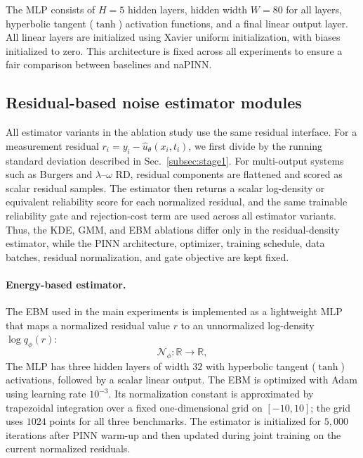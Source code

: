 \documentclass{article}
\theoremstyle{plain}
\theoremstyle{definition}
\theoremstyle{remark}
\begin{document}
The MLP consists of $H=5$ hidden layers, hidden width $W=80$ for all layers, hyperbolic tangent ($\tanh$) activation functions, and a final linear output layer. All linear layers are initialized using Xavier uniform initialization, with biases initialized to zero. This architecture is fixed across all experiments to ensure a fair comparison between baselines and naPINN.

\subsection{Residual-based noise estimator modules}
All estimator variants in the ablation study use the same residual interface.
For a measurement residual $r_i=y_i-\hat{u}_\theta(x_i,t_i)$, we first divide by the running standard deviation described in Sec.~\ref{subsec:stage1}.
For multi-output systems such as Burgers and $\lambda$--$\omega$ RD, residual components are flattened and scored as scalar residual samples.
The estimator then returns a scalar log-density or equivalent reliability score for each normalized residual, and the same trainable reliability gate and rejection-cost term are used across all estimator variants.
Thus, the KDE, GMM, and EBM ablations differ only in the residual-density estimator, while the PINN architecture, optimizer, training schedule, data batches, residual normalization, and gate objective are kept fixed.

\paragraph{Energy-based estimator.}
The EBM used in the main experiments is implemented as a lightweight MLP that maps a normalized residual value $r$ to an unnormalized log-density $\log q_\phi (r)$:
\begin{equation}
    \mathcal{N}_\phi: \mathbb{R} \rightarrow \mathbb{R},
\end{equation}
The MLP has three hidden layers of width $32$ with hyperbolic tangent ($\tanh$) activations, followed by a scalar linear output.
The EBM is optimized with Adam using learning rate $10^{-3}$.
Its normalization constant is approximated by trapezoidal integration over a fixed one-dimensional grid on $[-10,10]$; the grid uses $1024$ points for all three benchmarks. The estimator is initialized for $5{,}000$ iterations after PINN warm-up and then updated during joint training on the current normalized residuals.
\end{document}
